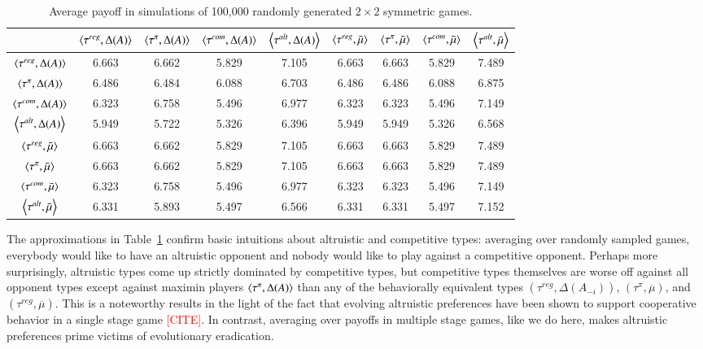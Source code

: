\documentclass[fleqn,reqno,11pt]{article}
\newcommand{\myalert}[1]{\textcolor{red}{#1}}
\begin{document}
\begin{table}[]
\centering
\footnotesize
\begin{tabular}{ccccccccc}
  \hline
 & $\left \langle \tau^{reg}, \Delta(A)\right\rangle$ 
 & $\left \langle \tau^{\pi}, \Delta(A)\right\rangle$ 
 & $\left \langle \tau^{com}, \Delta(A)\right\rangle$
 & $\left \langle \tau^{alt}, \Delta(A)\right\rangle$
 & $\left \langle \tau^{reg}, \bar{\mu}\right\rangle$ 
 & $\left \langle \tau^{\pi}, \bar{\mu}\right\rangle$ 
 & $\left \langle \tau^{com}, \bar{\mu}\right\rangle$
 & $\left \langle \tau^{alt}, \bar{\mu}\right\rangle$ \\ 
  \hline
  $\left \langle \tau^{reg}, \Delta(A)\right\rangle$ & 6.663 & 6.662 & 5.829 & 7.105 & 6.663 & 6.663 & 5.829 & 7.489 \\
  $\left \langle \tau^{\pi}, \Delta(A)\right\rangle$ & 6.486 & 6.484 & 6.088 & 6.703 & 6.486 & 6.486 & 6.088 & 6.875 \\
  $\left \langle \tau^{com}, \Delta(A)\right\rangle$ & 6.323 & 6.758 & 5.496 & 6.977 & 6.323 & 6.323 & 5.496 & 7.149 \\
  $\left \langle \tau^{alt}, \Delta(A)\right\rangle$ & 5.949 & 5.722 & 5.326 & 6.396 & 5.949 & 5.949 & 5.326 & 6.568 \\
  $\left \langle \tau^{reg}, \bar{\mu}\right\rangle$ & 6.663 & 6.662 & 5.829 & 7.105 & 6.663 & 6.663 & 5.829 & 7.489 \\
  $\left \langle \tau^{\pi}, \bar{\mu}\right\rangle$ & 6.663 & 6.662 & 5.829 & 7.105 & 6.663 & 6.663 & 5.829 & 7.489 \\
  $\left \langle \tau^{com}, \bar{\mu}\right\rangle$ & 6.323 & 6.758 & 5.496 & 6.977 & 6.323 & 6.323 & 5.496 & 7.149 \\
  $\left \langle \tau^{alt}, \bar{\mu}\right\rangle$ & 6.331 & 5.893 & 5.497 & 6.566 & 6.331 & 6.331 & 5.497 & 7.152 \\
   \hline                          
\end{tabular}                      
\caption{Average payoff in simulations of 100,000
  randomly generated $2 \times 2$ symmetric games.}
\label{tab:ExpectedFitness_2x2_Full}        
\end{table}   
 
 
The approximations in Table~\ref{tab:ExpectedFitness_2x2_Full} confirm basic intuitions about
altruistic and competitive types: averaging over randomly sampled games, everybody would like
to have an altruistic opponent and nobody would like to play against a competitive
opponent. Perhaps more surprisingly, altruistic types come up strictly dominated by competitive
types, but competitive types themselves are worse off against all opponent types except against
maximin players $\left \langle \tau^{\pi}, \Delta(A)\right\rangle$ than any of the behaviorally equivalent types
$(\tau^{reg}, \Delta(A_{-i}))$, $(\tau^{\pi}, \overline{\mu})$, and
$(\tau^{reg}, \overline{\mu})$.  This is a noteworthy results in the light of the fact that
evolving altruistic preferences have been shown to support cooperative behavior in a single
stage game \myalert{[CITE]}.  In contrast,
averaging over payoffs in multiple stage games, like we do here, makes altruistic preferences
prime victims of evolutionary eradication.
\end{document}
